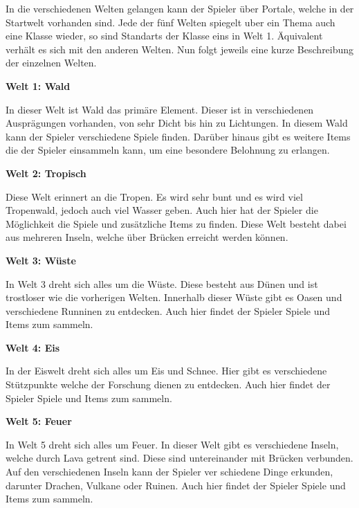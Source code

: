 In die verschiedenen Welten gelangen kann der Spieler über Portale, welche in der Startwelt vorhanden sind.
Jede der fünf Welten spiegelt uber ein Thema auch eine Klasse wieder, so sind Standarts der Klasse eins in Welt 1. Äquivalent verhält es sich mit den anderen Welten. Nun folgt jeweils eine kurze Beschreibung der einzelnen Welten.

\textbf{Welt 1: Wald}

In dieser Welt ist Wald das primäre Element. Dieser ist in verschiedenen Ausprägungen vorhanden, von sehr Dicht bis hin zu Lichtungen. In diesem Wald kann der Spieler verschiedene Spiele finden. Darüber hinaus gibt es weitere Items die der Spieler einsammeln kann, um eine besondere Belohnung zu erlangen.

\textbf{Welt 2: Tropisch}

Diese Welt erinnert an die Tropen. Es wird sehr bunt und es wird viel Tropenwald, jedoch auch viel Wasser geben. Auch hier hat der Spieler die Möglichkeit die Spiele und zusätzliche Items zu finden. Diese Welt besteht dabei aus mehreren Inseln, welche über Brücken erreicht werden können.

\textbf{Welt 3: Wüste}

In Welt 3 dreht sich alles um die Wüste. Diese besteht aus Dünen und ist trostloser wie die vorherigen Welten. Innerhalb dieser Wüste gibt es Oasen und verschiedene Runninen zu entdecken. Auch hier findet der Spieler Spiele und Items zum sammeln.

\textbf{Welt 4: Eis}

In der Eiswelt dreht sich alles um Eis und Schnee. Hier gibt es verschiedene Stützpunkte welche der Forschung dienen zu entdecken. Auch hier findet der Spieler Spiele und Items zum sammeln.

\textbf{Welt 5: Feuer}

In Welt 5 dreht sich alles um Feuer. In dieser Welt gibt es verschiedene Inseln, welche durch Lava getrent sind. Diese sind untereinander mit Brücken verbunden. Auf den verschiedenen Inseln kann der Spieler ver schiedene Dinge erkunden, darunter Drachen, Vulkane oder Ruinen. Auch hier findet der Spieler Spiele und Items zum sammeln.

	

